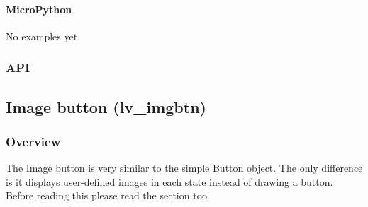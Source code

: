\documentclass[letterpaper,10pt,english]{sphinxmanual}
\begin{document}
\begin{sphinxVerbatim}[commandchars=\\\{\}]
     
 
    

   
 
    
\end{sphinxVerbatim}


\paragraph{MicroPython}
\label{\detokenize{object-types/img:micropython}}
No examples yet.


\subsubsection{API}
\label{\detokenize{object-types/img:api}}

\subsection{Image button (lv\_imgbtn)}
\label{\detokenize{object-types/imgbtn:image-button-lv-imgbtn}}\label{\detokenize{object-types/imgbtn::doc}}

\subsubsection{Overview}
\label{\detokenize{object-types/imgbtn:overview}}
The Image button is very similar to the simple Button object. The only difference is it displays user-defined images in each state instead of drawing a button.
Before reading this please read the {\hyperref[\detokenize{object-types/btn::doc}]{}} section too.
\end{document}
